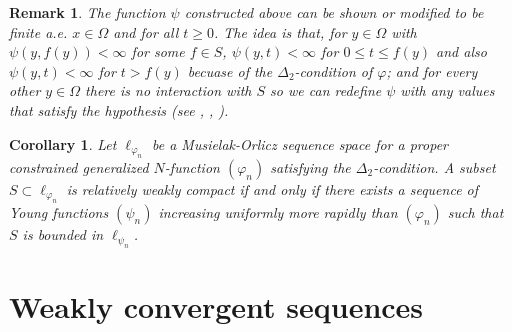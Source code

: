 \documentclass[11pt,a4paper]{amsart}
\newtheorem{corolario}[definicion]{Corollary}
\newtheorem{nota}[definicion]{Remark}
\newcommand\boldred[1]{\textcolor{red}{\textbf{#1}}}
\begin{document}
\begin{nota}
    The function $\psi$ constructed above can be shown or modified to be finite a.e. $x\in\Omega$ and for all $t\geq 0$. The idea is that, for $y\in\Omega$ with $\psi(y,f(y))<\infty$ for some $f\in S$, $\psi(y,t)<\infty$ for $0\leq t\leq f(y)$ and also $\psi(y,t)<\infty$ for $t> f(y)$ becuase of the $\Delta_2$-condition of $\varphi$; and for every other $y\in\Omega$ there is no interaction with $S$ so we can redefine $\psi$ with any values that satisfy the hypothesis (see \cite{PCM3}, \cite{Ando}, \cite{Nowak}).
\end{nota}


\begin{corolario}
Let $\ell_{\varphi_n}$ be a Musielak-Orlicz sequence space for a proper constrained generalized $N$-function $(\varphi_n)$ satisfying the $\Delta_2$-condition. A subset $S\subset \ell_{\varphi_n}$ is relatively weakly compact if and only if there exists a sequence of Young functions $(\psi_n)$ increasing uniformly more rapidly than $(\varphi_n)$ such that $S$ is bounded in $\ell_{\psi_n}$.
\end{corolario}



\section{Weakly convergent sequences}\label{sec.wconvergencia}
\end{document}
